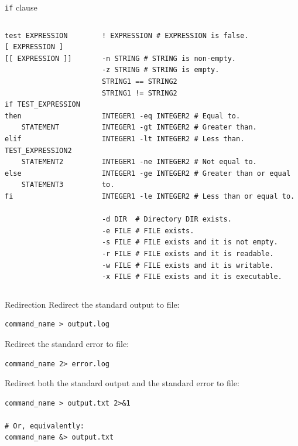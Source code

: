 \documentclass{beamer}
\begin{document}
\begin{frame}[fragile]{\texttt{if} clause}
\begin{columns}[t]
    \begin{column}{0.35\textwidth}
    \begin{lstlisting}
test EXPRESSION
[ EXPRESSION ]
[[ EXPRESSION ]]



if TEST_EXPRESSION
then
    STATEMENT
elif TEST_EXPRESSION2
    STATEMENT2
else
    STATEMENT3
fi
    \end{lstlisting}
    \end{column}
    \begin{column}{0.65\textwidth}
    \begin{lstlisting}[basicstyle=\scriptsize]
! EXPRESSION # EXPRESSION is false.

-n STRING # STRING is non-empty.
-z STRING # STRING is empty.
STRING1 == STRING2
STRING1 != STRING2

INTEGER1 -eq INTEGER2 # Equal to.
INTEGER1 -gt INTEGER2 # Greater than.
INTEGER1 -lt INTEGER2 # Less than.

INTEGER1 -ne INTEGER2 # Not equal to.
INTEGER1 -ge INTEGER2 # Greater than or equal to.
INTEGER1 -le INTEGER2 # Less than or equal to.

-d DIR  # Directory DIR exists.
-e FILE # FILE exists.
-s FILE # FILE exists and it is not empty.
-r FILE # FILE exists and it is readable.
-w FILE # FILE exists and it is writable.
-x FILE # FILE exists and it is executable.
    \end{lstlisting}
    \end{column}
\end{columns}
\end{frame}

\begin{frame}[fragile]{Redirection}
Redirect the standard output to file:
\begin{lstlisting}
command_name > output.log
\end{lstlisting}
\vfill
Redirect the standard error to file:
\begin{lstlisting}
command_name 2> error.log
\end{lstlisting}
\vfill
Redirect both the standard output and the standard error to file:
\begin{lstlisting}
command_name > output.txt 2>&1

# Or, equivalently:
command_name &> output.txt
\end{lstlisting}
\end{frame}
\end{document}
